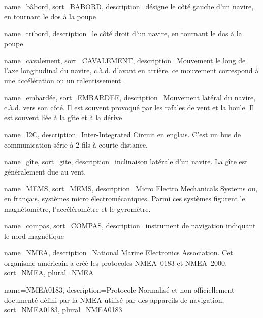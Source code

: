 

 {
	name=bâbord,
	sort={BABORD},
	description={désigne le côté gauche d'un navire, en tournant le dos à la poupe}
}


 {
	name=tribord,
	description={le côté droit d'un navire, en tournant le dos à la poupe}
}

 {
	name=cavalement,
	sort={CAVALEMENT},
	description={Mouvement le long de l'axe longitudinal du navire, c.à.d. d'avant en arrière, ce mouvement correspond à une accélération ou un ralentissement.}
}

 {
	name=embardée,
	sort={EMBARDEE},
	description={Mouvement latéral du navire, c.à.d. vers son côté. Il est souvent provoqué par les rafales de vent et la houle. Il est souvent liée à la gîte et à la dérive}
}

 {
	name=I2C,
	description={Inter-Integrated Circuit en englais. C'est un bus de communication série à 2 fils à courte distance.}
}

 {
	name=gîte,
        sort=gite,
	description={inclinaison latérale d'un navire. La gîte est généralement due au vent.}
}

 {
    name=MEMS,
    sort=MEMS,
    description={Micro Electro Mechanicals Systems ou, en français, systèmes micro électromécaniques. Parmi ces systèmes figurent le magnétomètre, l'accéléromètre et le gyromètre.}
    }

 {
    name=compas,
    sort=COMPAS,
    description={instrument de navigation indiquant le nord magnétique}
}

{
	name={NMEA}, %
	description={National Marine Electronics Association. Cet organisme américain a créé les protocoles NMEA~0183 et NMEA~2000}, %
	sort={NMEA}, %
	plural={NMEA} %
}

{
	name={NMEA0183}, %
	description={Protocole Normalisé et non officiellement documenté défini par la NMEA utilisé par des appareils de navigation}, %
	sort={NMEA0183}, %
	plural={NMEA0183} %
}


